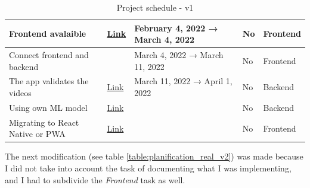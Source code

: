 \begin{table}[H]
{\begin{tabular}{|l|l|l|l|l|}
        \hline           Frontend avalaible                             & \href{https://github.com/JesusGonzalezA/LearnASL/milestone/3}{Link}    &       February 4, 2022  → March 4, 2022        & No    & Frontend  \\
        \hline           Connect frontend and backend                   &                                                         &       March 4, 2022     → March 11, 2022          & No    & Frontend  \\
        \hline           The app validates the videos                   & \href{https://github.com/JesusGonzalezA/LearnASL/milestone/5}{Link}    &       March 11, 2022    → April 1, 2022          & No    & Backend   \\
        \hline           Using own ML model                             & \href{https://github.com/JesusGonzalezA/LearnASL/milestone/10}{Link}   &                                               & No    & Backend   \\
        \hline           Migrating to React Native or PWA               & \href{https://github.com/JesusGonzalezA/LearnASL/milestone/9}{Link}    &                                               & No    & Frontend  \\
        \hline
    \end{tabular}
    }
\caption{Project schedule - v1}
\label{table:planification_real_v1}
\end{table}

The next modification (see table \ref{table:planification_real_v2}) was made because I did not take into account the task of documenting what I was implementing, and I had to subdivide the \textit{Frontend} task as well. \\

